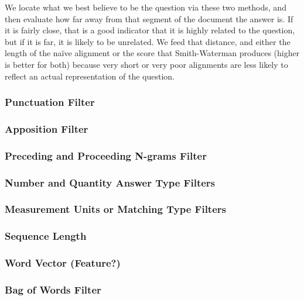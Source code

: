 \documentclass{article}
\begin{document}
	We locate what we best believe to be the question via these two methods, and
	then evaluate how far away from that segment of the document the answer is.
	If it is fairly close, that is a good indicator that it is highly related to
	the question, but if it is far, it is likely to be unrelated.  We feed that
	distance, and either the length of the na\"ive alignment or the score that
	Smith-Waterman produces (higher is better for both) because very short or
	very poor alignments are less likely to reflect an actual representation of
	the question.

\subsubsection{Punctuation Filter}

\subsubsection{Apposition Filter}

\subsubsection{Preceding and Proceeding N-grams Filter}

\subsubsection{Number and Quantity Answer Type Filters}

\subsubsection{Measurement Units or Matching Type Filters}

\subsubsection{Sequence Length}

\subsubsection{Word Vector (Feature?)}

\subsubsection{Bag of Words Filter}
\end{document}
